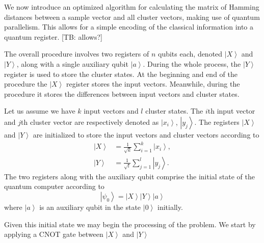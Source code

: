 \documentclass[pra,showkeys,twocolumn,showpacs]{revtex4-1}
\begin{document}
We now introduce an optimized algorithm for calculating the matrix of Hamming distances \cite{trugenberger2001} between a sample vector and all cluster vectors, making use of quantum parallelism.  This allows for a simple encoding of the classical information into a quantum register. [TB: allows?]

The overall procedure involves two registers of $n$ qubits each, denoted $\left| X \right\rangle$ and $\left| Y \right\rangle$, along with a single auxiliary qubit $\left| a \right\rangle$. During the whole process, the $\left| Y \right\rangle$ register is used to store the cluster states.  At the beginning and end of the procedure the $\left| X \right\rangle$ register stores the input vectors.  Meanwhile, during the procedure it stores the differences between input vectors and cluster states.

Let us assume we have $k$ input vectors and $l$ cluster states. The $i$th input vector and $j$th cluster vector are respectively denoted as $\left| x_i \right\rangle$, $\left| y_j \right\rangle$. The registers $\left| X \right\rangle$ and $\left| Y \right\rangle$ are initialized to store the input vectors and cluster vectors according to
%
\begin{align}
    \left| X \right\rangle  & = \frac{1}{\sqrt{k}} \sum\limits_{i=1}^{k} \left| x_i \right\rangle,  \\
    \left| Y \right\rangle&  = \frac{1}{\sqrt{l}} \sum\limits_{j=1}^{l} \left| y_j \right\rangle .
    \label{eq:encodnig}
\end{align}
% 
The two registers along with the auxiliary qubit comprise the initial state of the quantum computer according to
%
\begin{equation} 
\left| \psi_0 \right\rangle = 
    \left| X \right\rangle
    \left| Y \right\rangle 
    \left| a \right\rangle
    \label{eq:initial_state}
\end{equation}
%
where $\left| a \right\rangle$ is an auxiliary qubit in the state $\left| 0 \right\rangle$ initially.

Given this initial state we may begin the processing of the problem. We start by applying a CNOT gate between $\left| X \right\rangle$ and $\left| Y \right\rangle$
\end{document}
